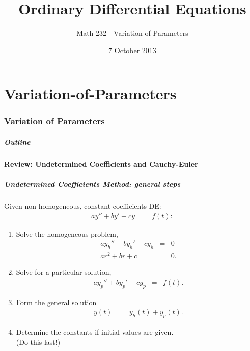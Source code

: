 \part{Variation-of-Parameters}
\section{Variation of Parameters}

\title{Ordinary Differential Equations}
\subtitle{Math 232 - Variation of Parameters}
\date{7 October 2013}

\begin{frame}
  \titlepage
\end{frame}

\begin{frame}
  \frametitle{Outline}
  \tableofcontents[ currentsection ]
\end{frame}

\subsection{Review: Undetermined Coefficients and Cauchy-Euler}

\begin{frame}
  \frametitle{Undetermined Coefficients Method: general steps}

  Given non-homogeneous, constant coefficients DE:
  \begin{eqnarray*}
    a y'' + by' + cy & = & f(t):
  \end{eqnarray*}
  \vspace{-0.5cm}
  \begin{enumerate}
  \item Solve the homogeneous problem,
    {\color{blue}\begin{eqnarray*}
      a y_h'' + by_h' + cy_h & = & 0\\
      a r^2 + br + c & = & 0.
    \end{eqnarray*}}
  \vspace{-0.5cm}
  \item Solve for a particular solution,
    {\color{blue}\begin{eqnarray*}
      a y_p'' + by_p' + cy_p & = & f(t).
    \end{eqnarray*}}
  \item Form the general solution
   {\color{red} \begin{eqnarray*}
      y(t) & = & y_h(t) + y_p(t).
    \end{eqnarray*}}
  \item Determine the constants if initial values are given. \\
    (Do this last!)
  \end{enumerate}


\end{frame}

